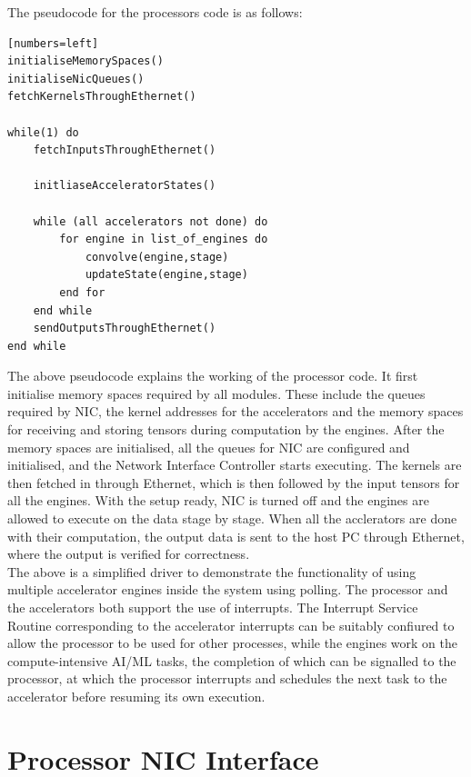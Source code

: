 \documentclass[a4paper,11pt, final]{report}
\begin{document}
		\clearpage
The pseudocode for the processors code is as follows:

\begin{verbatim}[numbers=left]
initialiseMemorySpaces()
initialiseNicQueues()
fetchKernelsThroughEthernet()

while(1) do
	fetchInputsThroughEthernet()
	
	initliaseAcceleratorStates()
	
	while (all accelerators not done) do
		for engine in list_of_engines do
			convolve(engine,stage)
			updateState(engine,stage)
		end for
	end while
	sendOutputsThroughEthernet()
end while
\end{verbatim}

The above pseudocode explains the working of the processor code. It first initialise memory spaces required by all modules. These include the queues required by NIC, the kernel addresses for the accelerators and the memory spaces for receiving and storing tensors during computation by the engines. After the memory spaces are initialised, all the queues for NIC are configured and initialised, and the Network Interface Controller starts executing. The kernels are then fetched in through Ethernet, which is then followed by the input tensors for all the engines. With the setup ready, NIC is turned off and the engines are allowed to execute on the data stage by stage. When all the acclerators are done with their computation, the output data is sent to the host PC through Ethernet, where the output is verified for correctness.
\\

The above is a simplified driver to demonstrate the functionality of using multiple accelerator engines inside the system using polling. The processor and the  accelerators both support the use of interrupts. The Interrupt Service Routine corresponding to the accelerator interrupts can be suitably confiured to allow the processor to be used for other processes, while the engines work on the compute-intensive AI/ML tasks, the completion of which can be signalled to the processor, at which the processor interrupts and schedules the next task to the accelerator before resuming its own execution.
\\


\section{Processor NIC Interface}
\end{document}
